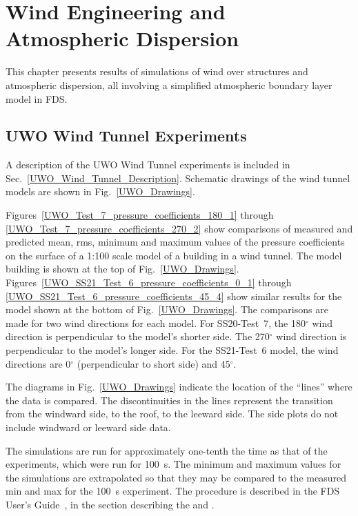 
\chapter{Wind Engineering and Atmospheric Dispersion}

This chapter presents results of simulations of wind over structures and atmospheric dispersion, all involving a simplified atmospheric boundary layer model in FDS.


\section{UWO Wind Tunnel Experiments}

A description of the UWO Wind Tunnel experiments is included in Sec.~\ref{UWO_Wind_Tunnel_Description}. Schematic drawings of the wind tunnel models are shown in Fig.~\ref{UWO_Drawings}.

Figures~\ref{UWO_Test_7_pressure_coefficients_180_1} through \ref{UWO_Test_7_pressure_coefficients_270_2} show comparisons of measured and predicted mean, rms, minimum and maximum values of the pressure coefficients on the surface of a 1:100 scale model of a building in a wind tunnel. The model building is shown at the top of Fig.~\ref{UWO_Drawings}. Figures~\ref{UWO_SS21_Test_6_pressure_coefficients_0_1} through \ref{UWO_SS21_Test_6_pressure_coefficients_45_4} show similar results for the model shown at the bottom of Fig.~\ref{UWO_Drawings}. The comparisons are made for two wind directions for each model. For SS20-Test~7, the 180$^\circ$ wind direction is perpendicular to the model's shorter side. The 270$^\circ$ wind direction is perpendicular to the model's longer side. For the SS21-Test~6 model, the wind directions are 0$^\circ$ (perpendicular to short side) and 45$^\circ$.

The diagrams in Fig.~\ref{UWO_Drawings} indicate the location of the ``lines'' where the data is compared. The discontinuities in the lines represent the transition from the windward side, to the roof, to the leeward side. The side plots do not include windward or leeward side data.

The simulations are run for approximately one-tenth the time as that of the experiments, which were run for 100~s. The minimum and maximum values for the simulations are extrapolated so that they may be compared to the measured min and max for the 100~s experiment. The procedure is described in the FDS User's Guide~\cite{FDS_Users_Guide}, in the section describing the   and .

